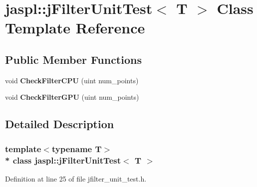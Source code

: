 \hypertarget{classjaspl_1_1j_filter_unit_test}{}\section{jaspl\+:\+:j\+Filter\+Unit\+Test$<$ T $>$ Class Template Reference}
\label{classjaspl_1_1j_filter_unit_test}
\subsection*{Public Member Functions}
\begin{DoxyCompactItemize}
\item 
void {\bfseries Check\+Filter\+C\+PU} (uint num\+\_\+points)\hypertarget{classjaspl_1_1j_filter_unit_test_ad7d58b5daf92be1e51afacdb3c04419d}{}\label{classjaspl_1_1j_filter_unit_test_ad7d58b5daf92be1e51afacdb3c04419d}

\item 
void {\bfseries Check\+Filter\+G\+PU} (uint num\+\_\+points)\hypertarget{classjaspl_1_1j_filter_unit_test_a875d01230ae647f7615c96065ab41779}{}\label{classjaspl_1_1j_filter_unit_test_a875d01230ae647f7615c96065ab41779}

\end{DoxyCompactItemize}


\subsection{Detailed Description}
\subsubsection*{template$<$typename T$>$\\*
class jaspl\+::j\+Filter\+Unit\+Test$<$ T $>$}



Definition at line 25 of file jfilter\+\_\+unit\+\_\+test.\+h.

